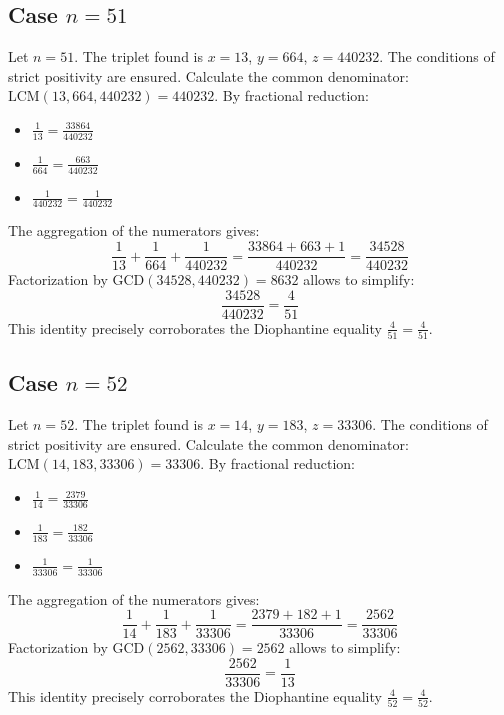 \documentclass[11pt,a4paper]{article}
\begin{document}
\subsection{Case $n = 51$}
Let $n = 51$. The triplet found is $x = 13$, $y = 664$, $z = 440232$.
The conditions of strict positivity are ensured.
Calculate the common denominator: $\text{LCM}(13, 664, 440232) = 440232$.
By fractional reduction:
\begin{itemize}
    \item $\frac{1}{13} = \frac{33864}{440232}$
    \item $\frac{1}{664} = \frac{663}{440232}$
    \item $\frac{1}{440232} = \frac{1}{440232}$
\end{itemize}
The aggregation of the numerators gives:
$$ \frac{1}{13} + \frac{1}{664} + \frac{1}{440232} = \frac{33864 + 663 + 1}{440232} = \frac{34528}{440232} $$
Factorization by $\text{GCD}(34528, 440232) = 8632$ allows to simplify:
$$ \frac{34528}{440232} = \frac{4}{51} $$
This identity precisely corroborates the Diophantine equality $\frac{4}{51} = \frac{4}{51}$.

\subsection{Case $n = 52$}
Let $n = 52$. The triplet found is $x = 14$, $y = 183$, $z = 33306$.
The conditions of strict positivity are ensured.
Calculate the common denominator: $\text{LCM}(14, 183, 33306) = 33306$.
By fractional reduction:
\begin{itemize}
    \item $\frac{1}{14} = \frac{2379}{33306}$
    \item $\frac{1}{183} = \frac{182}{33306}$
    \item $\frac{1}{33306} = \frac{1}{33306}$
\end{itemize}
The aggregation of the numerators gives:
$$ \frac{1}{14} + \frac{1}{183} + \frac{1}{33306} = \frac{2379 + 182 + 1}{33306} = \frac{2562}{33306} $$
Factorization by $\text{GCD}(2562, 33306) = 2562$ allows to simplify:
$$ \frac{2562}{33306} = \frac{1}{13} $$
This identity precisely corroborates the Diophantine equality $\frac{4}{52} = \frac{4}{52}$.
\end{document}
